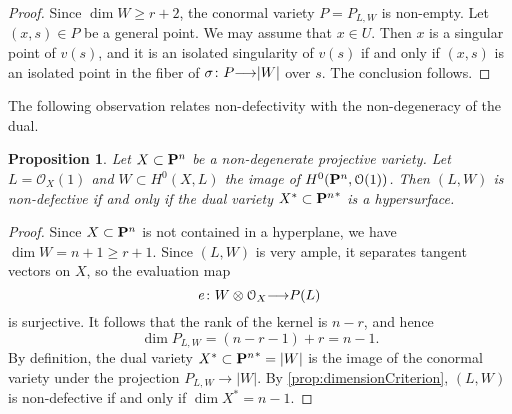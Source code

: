 \documentclass[11pt,reqno]{amsart}
\theoremstyle{plain}
\newtheorem{proposition}[theorem]{Proposition}
\theoremstyle{definition}
\theoremstyle{remark}
\numberwithin{equation}{section}
\renewcommand{\to}{{\longrightarrow}}
\numberwithin{equation}{section}
\renewcommand{\O}{\mathcal O}
\begin{document}
\begin{proof}
  Since $\dim W \geq r+2$, the conormal variety $P = P_{L,W}$ is non-empty.
  Let $(x,s) \in P$ be a general point.
  We may assume that $x \in U$.
  Then $x$ is a singular point of $v(s)$, and it is an isolated singularity of $v(s)$ if and only if $(x,s)$ is an isolated point in the fiber of $\sigma \from P \to |W|$ over $s$.
  The conclusion follows.
\end{proof}

The following observation relates non-defectivity with the non-degeneracy of the dual.
\begin{proposition}\label{prop:non-deg-dual}
  Let $X \subset \P^n$ be a non-degenerate projective variety.  Let $L = \O_X(1)$ and $W \subset H^0(X, L)$ the image of $H^0(\P^n, \O(1))$.
  Then $(L, W)$ is non-defective if and only if the dual variety $X^* \subset {\P^n}^*$ is a hypersurface.
\end{proposition}
\begin{proof}
  Since $X \subset \P^n$ is not contained in a hyperplane, we have $\dim W = n+1 \geq r+1$.
  Since $(L, W)$ is very ample, it separates tangent vectors on $X$, so the evaluation map
  \[ e \from W \otimes \O_X \to P(L)  \]
  is surjective.
  It follows that the rank of the kernel is $n-r$, and hence
  \[ \dim P_{L,W} = (n-r - 1) + r = n-1.\]
  By definition, the dual variety $X^* \subset {\P^n}^* = |W|$ is the image of the conormal variety under the projection $P_{L,W} \to |W|$.
  By \autoref{prop:dimensionCriterion}, $(L, W)$ is non-defective if and only if $\dim X^* = n-1$.
\end{proof}
\end{document}
